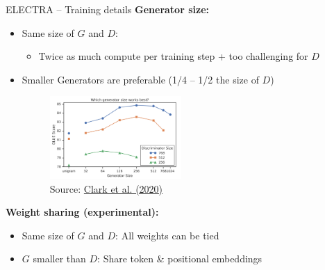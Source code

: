 
\begin{frame}{ELECTRA -- Training details}
\small
	\textbf{Generator size:}

	\begin{itemize}
		\item Same size of $G$ and $D$: 
			\begin{itemize}
				\item Twice as much compute per training step + too challenging for $D$
			\end{itemize}
		\item Smaller Generators are preferable (1/4 -- 1/2 the size of $D$)
	\begin{figure}
		\centering
		\includegraphics[width = 5cm]{figure/electra-size-g.png}\\ 
		\scriptsize{Source:} \href{https://arxiv.org/pdf/2003.10555.pdf}{\scriptsize Clark et al. (2020)}
	\end{figure}
	\end{itemize}
	
	\textbf{Weight sharing (experimental):}

	\begin{itemize}
		\item Same size of $G$ and $D$: All weights can be tied
		\item $G$ smaller than $D$: Share token \& positional embeddings 
	\end{itemize}
\end{frame}


